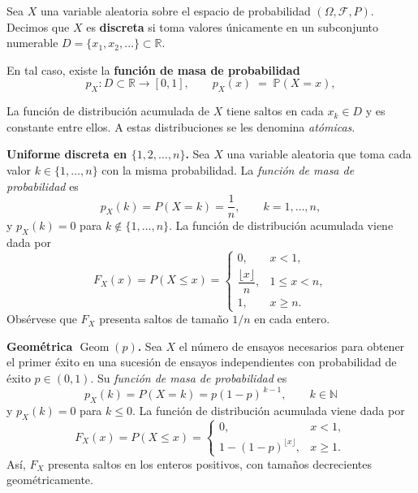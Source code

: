 \documentclass[../Main.tex]{subfiles}
\begin{document}
\begin{definition}
\label{}
Sea $X$ una variable aleatoria sobre el espacio de probabilidad
$(\Omega,\mathcal F,P)$.
Decimos que $X$ es \textbf{discreta} si toma valores únicamente en un
subconjunto numerable $D=\{x_1,x_2,\dots\}\subset\mathbb R$.

En tal caso, existe la \textbf{función de masa de probabilidad}
\[
    p_X:D\subset\mathbb R\longrightarrow[0,1],
    \qquad
    p_X(x)\;=\;\mathbb{P}(X=x),
\]

\end{definition}
\begin{remark}
\label{}
La función de distribución acumulada de $X$ tiene saltos en cada $x_k\in D$ y es constante entre ellos.  A estas distribuciones se les denomina \emph{atómicas}.
\end{remark}
\begin{example}
\label{}
\textbf{Uniforme discreta en \(\{1,2,\dots,n\}\).}\;
Sea \(X\) una variable aleatoria que toma cada valor
\(k\in\{1,\dots,n\}\) con la misma probabilidad.
La \emph{función de masa de probabilidad} es  
\[
    p_X(k)=P(X=k)=\frac{1}{n},
    \qquad k=1,\dots,n,
\]
y \(p_X(k)=0\) para \(k\notin\{1,\dots,n\}\).
La función de distribución acumulada viene dada por
\[
    F_X(x)=P(X\le x)=
    \begin{cases}
        0, & x<1,\\[4pt]
        \dfrac{\lfloor x\rfloor}{n}, & 1\le x<n,\\[10pt]
        1, & x\ge n.
    \end{cases}
\]
Obsérvese que \(F_X\) presenta saltos de tamaño \(1/n\) en cada entero.
\end{example}
\begin{example}
\label{}
\textbf{Geométrica \(\operatorname{Geom}(p)\).}\;
Sea \(X\) el número de ensayos necesarios para obtener el primer éxito
en una sucesión de ensayos independientes con probabilidad
de éxito \(p\in(0,1)\).
Su \emph{función de masa de probabilidad} es
\[
    p_X(k)=P(X=k)=p(1-p)^{\,k-1},
    \qquad k\in\mathbb{N}
\]
y \(p_X(k)=0\) para \(k\le 0\).
La función de distribución acumulada viene dada por
\[
    F_X(x)=P(X\le x)=
    \begin{cases}
        0, & x<1,\\[6pt]
        1-(1-p)^{\lfloor x\rfloor}, & x\ge 1.
    \end{cases}
\]
Así, \(F_X\) presenta saltos en los enteros positivos,
con tamaños decrecientes geométricamente.
\end{example}
\end{document}
